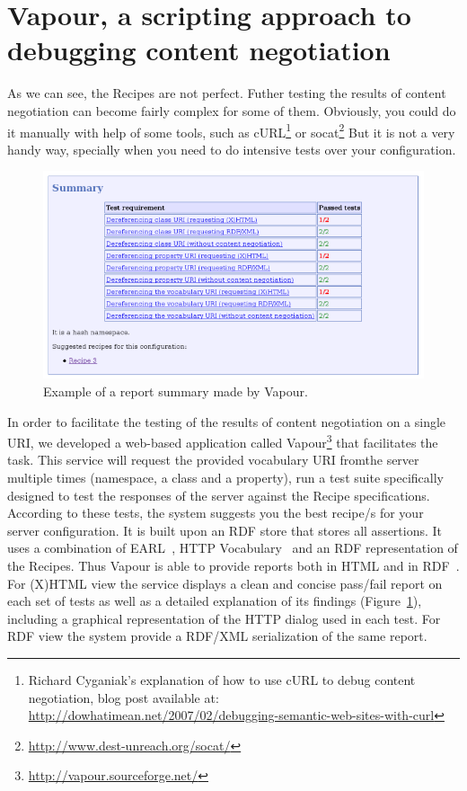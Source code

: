 \documentclass{../templates/llncs}
\begin{document}

\section{\label{sec:vapour}Vapour, a scripting approach to debugging content negotiation} 

As we can see, the Recipes are not perfect. Futher testing the results of content 
negotiation can become fairly complex for some of them. Obviously, you could do 
it manually with help of some tools, such as 
cURL\footnote{Richard Cyganiak's explanation of how to use cURL to debug content negotiation, 
blog post available at: \url{http://dowhatimean.net/2007/02/debugging-semantic-web-sites-with-curl}}
or socat\footnote{\url{http://www.dest-unreach.org/socat/}}
But it is not a very handy way, specially when you need to do intensive tests over your 
configuration.

\begin{figure}
 \centering
 \includegraphics[width=12cm]{images/report-summary.png}
 \caption{\label{fig:report-summary}Example of a report summary made by Vapour.}
\end{figure}

In order to facilitate the testing of the results of content negotiation on a single 
URI, we developed a web-based application called Vapour\footnote{\url{http://vapour.sourceforge.net/}}
that facilitates the task. This service will request the provided vocabulary 
URI fromthe server multiple times (namespace, a class and a property), run a 
test suite specifically designed to test the responses of the server against 
the Recipe specifications. According to these tests, the system suggests you the 
best recipe/s for your server configuration. It is built upon an RDF store %
that stores all assertions. It uses a combination of EARL~\cite{EARL}, HTTP
Vocabulary~\cite{Koch2007} and an RDF representation of the Recipes. Thus Vapour 
is able to provide reports both in HTML and in RDF~\cite{RDF}. For (X)HTML view 
the service displays a clean and concise pass/fail report on each set of tests 
as  well as a detailed explanation of its  findings (Figure~\ref{fig:report-summary}), 
including a graphical representation of the HTTP dialog used in each test.
For RDF view %
the system provide a RDF/XML serialization of the same report.
\end{document}
